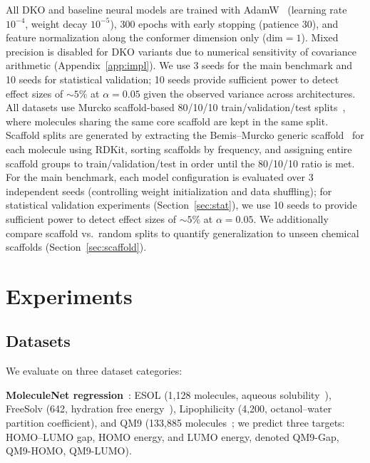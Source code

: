 \documentclass[sigconf]{acmart}
\newcommand{\rev}[1]{#1}
\begin{document}
All DKO and baseline neural models are trained with AdamW~\cite{loshchilov2019adamw} (learning rate $10^{-4}$, weight decay $10^{-5}$), 300 epochs with early stopping (patience 30), and feature normalization along the conformer dimension only ($\text{dim}=1$). Mixed precision is disabled for DKO variants due to numerical sensitivity of covariance arithmetic (Appendix~\ref{app:impl}). We use 3 seeds for the main benchmark and 10 seeds for statistical validation; 10 seeds provide sufficient power to detect effect sizes of ${\sim}5\%$ at $\alpha = 0.05$ given the observed variance across architectures. All datasets use Murcko scaffold-based 80/10/10 train/validation/test splits~\cite{bemis1996scaffolds}, where molecules sharing the same core scaffold are kept in the same split. \rev{Scaffold splits are generated by extracting the Bemis--Murcko generic scaffold~\cite{bemis1996scaffolds} for each molecule using RDKit, sorting scaffolds by frequency, and assigning entire scaffold groups to train/validation/test in order until the 80/10/10 ratio is met. For the main benchmark, each model configuration is evaluated over 3 independent seeds (controlling weight initialization and data shuffling); for statistical validation experiments (Section~\ref{sec:stat}), we use 10 seeds to provide sufficient power to detect effect sizes of ${\sim}5\%$ at $\alpha = 0.05$.} We additionally compare scaffold vs.\ random splits to quantify generalization to unseen chemical scaffolds (Section~\ref{sec:scaffold}).

\section{Experiments}

\subsection{Datasets}

We evaluate on three dataset categories:

\textbf{MoleculeNet regression}~\cite{wu2018moleculenet}: ESOL (1,128 molecules, aqueous solubility~\cite{delaney2004esol}), FreeSolv (642, hydration free energy~\cite{mobley2014freesolv}), Lipophilicity (4,200, octanol--water partition coefficient), and QM9 (133,885 molecules~\cite{ramakrishnan2014qm9}; we predict three targets: HOMO--LUMO gap, HOMO energy, and LUMO energy, denoted QM9-Gap, QM9-HOMO, QM9-LUMO).
\end{document}
